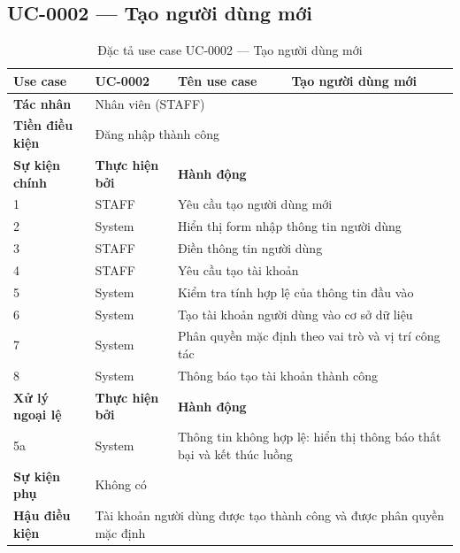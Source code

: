 \documentclass[../DoAn.tex]{subfiles}
\begin{document}
\subsection{UC-0002 — Tạo người dùng mới}

\begin{table}[H]
\centering
\caption{Đặc tả use case UC-0002 — Tạo người dùng mới}
\label{tab:uc-0002}
\renewcommand{\arraystretch}{1.3}
\begin{tabular}{|p{3.0cm}|p{2.3cm}|p{2.7cm}|p{4.5cm}|}
\hline
\textbf{Use case} & UC-0002 & \textbf{Tên use case} & Tạo người dùng mới \\
\hline
\textbf{Tác nhân} & \multicolumn{3}{p{9.5cm}|}{Nhân viên (STAFF)} \\
\hline
\textbf{Tiền điều kiện} & \multicolumn{3}{p{9.5cm}|}{Đăng nhập thành công} \\
\hline
\textbf{Sự kiện chính} & \textbf{Thực hiện bởi} & \multicolumn{2}{p{7.2cm}|}{\textbf{Hành động}} \\
\hline
1 & STAFF & \multicolumn{2}{p{7.2cm}|}{Yêu cầu tạo người dùng mới} \\
\hline
2 & System & \multicolumn{2}{p{7.2cm}|}{Hiển thị form nhập thông tin người dùng} \\
\hline
3 & STAFF & \multicolumn{2}{p{7.2cm}|}{Điền thông tin người dùng} \\
\hline
4 & STAFF & \multicolumn{2}{p{7.2cm}|}{Yêu cầu tạo tài khoản} \\
\hline
5 & System & \multicolumn{2}{p{7.2cm}|}{Kiểm tra tính hợp lệ của thông tin đầu vào} \\
\hline
6 & System & \multicolumn{2}{p{7.2cm}|}{Tạo tài khoản người dùng vào cơ sở dữ liệu} \\
\hline
7 & System & \multicolumn{2}{p{7.2cm}|}{Phân quyền mặc định theo vai trò và vị trí công tác} \\
\hline
8 & System & \multicolumn{2}{p{7.2cm}|}{Thông báo tạo tài khoản thành công} \\
\hline
\textbf{Xử lý ngoại lệ} & \textbf{Thực hiện bởi} & \multicolumn{2}{p{7.2cm}|}{\textbf{Hành động}} \\
\hline
5a & System & \multicolumn{2}{p{7.2cm}|}{Thông tin không hợp lệ: hiển thị thông báo thất bại và kết thúc luồng} \\
\hline
\textbf{Sự kiện phụ} & \multicolumn{3}{p{9.5cm}|}{Không có} \\
\hline
\textbf{Hậu điều kiện} & \multicolumn{3}{p{9.5cm}|}{Tài khoản người dùng được tạo thành công và được phân quyền mặc định} \\
\hline
\end{tabular}
\end{table}
\end{document}
